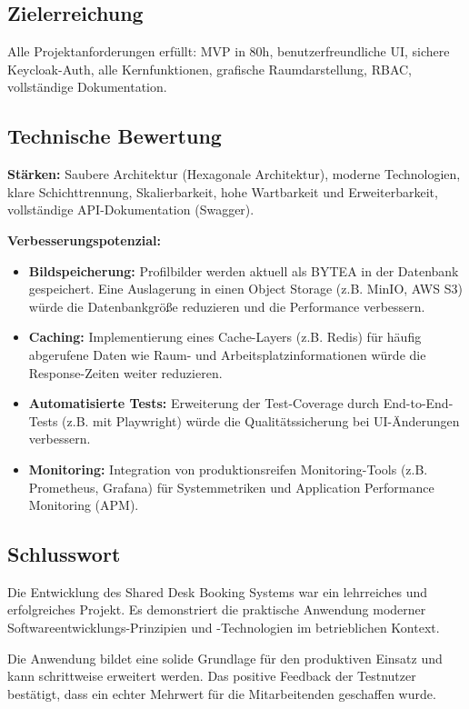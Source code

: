\documentclass[11pt,a4paper]{report}
\begin{document}
\subsection{Zielerreichung}

Alle Projektanforderungen erfüllt: MVP in 80h, benutzerfreundliche UI, sichere Keycloak-Auth, alle Kernfunktionen, grafische Raumdarstellung, RBAC, vollständige Dokumentation.

\subsection{Technische Bewertung}

\textbf{Stärken:} Saubere Architektur (Hexagonale Architektur), moderne Technologien, klare Schichttrennung, Skalierbarkeit, hohe Wartbarkeit und Erweiterbarkeit, vollständige API-Dokumentation (Swagger).

\textbf{Verbesserungspotenzial:}
\begin{itemize}
    \item \textbf{Bildspeicherung:} Profilbilder werden aktuell als BYTEA in der Datenbank gespeichert. Eine Auslagerung in einen Object Storage (z.B. MinIO, AWS S3) würde die Datenbankgröße reduzieren und die Performance verbessern.
    \item \textbf{Caching:} Implementierung eines Cache-Layers (z.B. Redis) für häufig abgerufene Daten wie Raum- und Arbeitsplatzinformationen würde die Response-Zeiten weiter reduzieren.
    \item \textbf{Automatisierte Tests:} Erweiterung der Test-Coverage durch End-to-End-Tests (z.B. mit Playwright) würde die Qualitätssicherung bei UI-Änderungen verbessern.
    \item \textbf{Monitoring:} Integration von produktionsreifen Monitoring-Tools (z.B. Prometheus, Grafana) für Systemmetriken und Application Performance Monitoring (APM).
\end{itemize}

\subsection{Schlusswort}

Die Entwicklung des Shared Desk Booking Systems war ein lehrreiches und erfolgreiches Projekt. Es demonstriert die praktische Anwendung moderner Softwareentwicklungs-Prinzipien und -Technologien im betrieblichen Kontext.

Die Anwendung bildet eine solide Grundlage für den produktiven Einsatz und kann schrittweise erweitert werden. Das positive Feedback der Testnutzer bestätigt, dass ein echter Mehrwert für die Mitarbeitenden geschaffen wurde.
\end{document}
